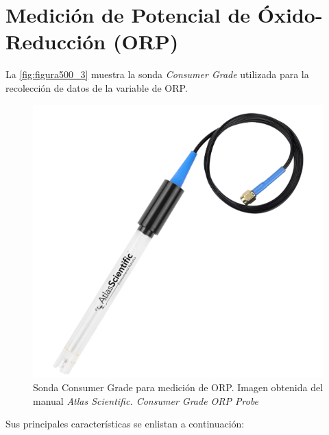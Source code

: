 \section{Medición de Potencial de Óxido-Reducción (ORP)}

La \autoref{fig:figura500_3} muestra la sonda \textit{Consumer Grade} utilizada para la recolección de datos de la variable de ORP.

\begin{figure}[h]
	\centering
	\includegraphics[scale=0.6]{imgss112.png}
	\caption{Sonda Consumer Grade para medición de ORP. Imagen obtenida del manual \textit{Atlas Scientific. Consumer Grade ORP Probe}}
	\label{fig:figura500_3}
\end{figure}

Sus principales características se enlistan a continuación:


